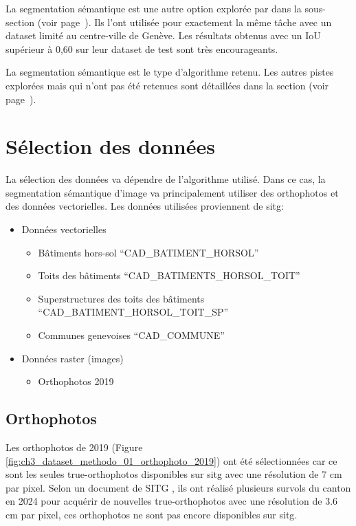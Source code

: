 La segmentation sémantique est une autre option explorée par \citeauthor{castello_quantification_2021} dans la sous-section \textit{} (voir page~\pageref{subsec:castello_quantification_2021}). Ils l'ont utilisée pour exactement la même tâche avec un dataset limité au centre-ville de Genève. Les résultats obtenus avec un IoU supérieur à 0,60 sur leur dataset de test sont très encourageants.

La segmentation sémantique est le type d'algorithme retenu. Les autres pistes explorées mais qui n'ont pas été retenues sont détaillées dans la section \textit{} (voir page~\pageref{sec:pistes_explorees}).

\section{Sélection des données}
La sélection des données va dépendre de l'algorithme utilisé. Dans ce cas, la segmentation sémantique d'image va principalement utiliser des orthophotos et des données vectorielles. Les données utilisées proviennent de \acrshort{sitg}:
\begin{itemize}
    \item Données vectorielles
    \begin{itemize}
        \item Bâtiments hors-sol ``CAD\_BATIMENT\_HORSOL'' \cite{sitg_batiments_nodate}
        \item Toits des bâtiments ``CAD\_BATIMENTS\_HORSOL\_TOIT'' \cite{sitg_toits_nodate}
        \item Superstructures des toits des bâtiments ``CAD\_BATIMENT\_HORSOL\_TOIT\_SP'' \cite{sitg_superstructures_nodate}
        \item Communes genevoises ``CAD\_COMMUNE'' \cite{sitg_communes_nodate}
    \end{itemize}
    \item Données raster (images)
    \begin{itemize}
        \item Orthophotos 2019 \cite{sitg_orthophotos_nodate}
    \end{itemize}
\end{itemize}

\subsection{Orthophotos}
Les orthophotos de 2019 (Figure \ref{fig:ch3_dataset_methodo_01_orthophoto_2019}) ont été sélectionnées car ce sont les seules true-orthophotos disponibles sur \acrshort{sitg} avec une résolution de 7 \si{\unit{cm}} par pixel. Selon un document de SITG \cite{etat_de_geneve_inventaire_2025}, ils ont réalisé plusieurs survols du canton en 2024 pour acquérir de nouvelles true-orthophotos avec une résolution de 3.6 \si{\unit{cm}} par pixel, ces orthophotos ne sont pas encore disponibles sur \acrshort{sitg}.

